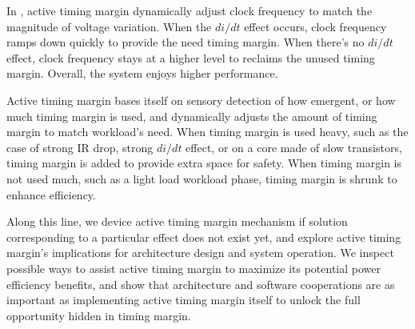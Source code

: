 In , active timing margin dynamically adjust clock frequency to match the magnitude of voltage variation. When the $di/dt$ effect occurs, clock frequency ramps down quickly to provide the need timing margin. When there's no $di/dt$ effect, clock frequency stays at a higher level to reclaims the unused timing margin. Overall, the system enjoys higher performance.

Active timing margin bases itself on sensory detection of how emergent, or how much timing margin is used, and dynamically adjusts the amount of timing margin to match workload's need. When timing margin is used heavy, such as the case of strong IR drop, strong $di/dt$ effect, or on a core made of slow transistors, timing margin is added to provide extra space for safety. When timing margin is not used much, such as a light load workload phase, timing margin is shrunk to enhance efficiency. 

Along this line, we device active timing margin mechanism if solution corresponding to a particular effect does not exist yet, and explore active timing margin's implications for architecture design and system operation. We inspect possible ways to assist active timing margin to maximize its potential power efficiency benefits, and show that architecture and software cooperations are as important as implementing active timing margin itself to unlock the full opportunity hidden in timing margin.
